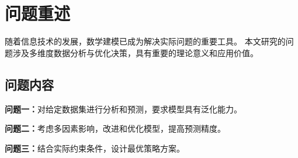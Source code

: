 \section{问题重述}


随着信息技术的发展，数学建模已成为解决实际问题的重要工具。
本文研究的问题涉及多维度数据分析与优化决策，具有重要的理论意义和应用价值。

\subsection{问题内容}
\textbf{问题一：}对给定数据集进行分析和预测，要求模型具有泛化能力。

\textbf{问题二：}考虑多因素影响，改进和优化模型，提高预测精度。

\textbf{问题三：}结合实际约束条件，设计最优策略方案。

